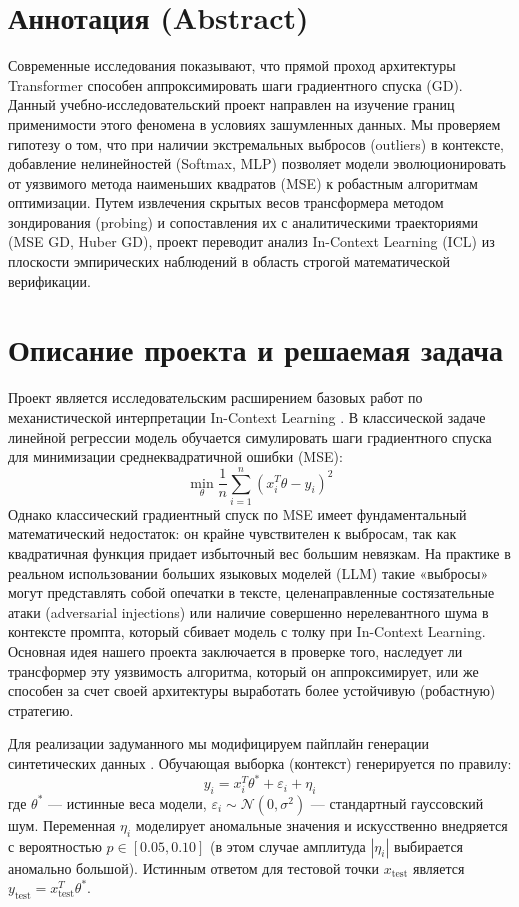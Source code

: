 \documentclass[12pt,a4paper]{article}
\begin{document}
\section*{Аннотация (Abstract)}
Современные исследования \cite{vonOswald2023} показывают, что прямой проход архитектуры Transformer способен аппроксимировать шаги градиентного спуска (GD). Данный учебно-исследовательский проект направлен на изучение границ применимости этого феномена в условиях зашумленных данных. Мы проверяем гипотезу о том, что при наличии экстремальных выбросов (outliers) в контексте, добавление нелинейностей (Softmax, MLP) позволяет модели эволюционировать от уязвимого метода наименьших квадратов (MSE) к робастным алгоритмам оптимизации. Путем извлечения скрытых весов трансформера методом зондирования (probing) и сопоставления их с аналитическими траекториями (MSE GD, Huber GD), проект переводит анализ In-Context Learning (ICL) из плоскости эмпирических наблюдений в область строгой математической верификации.

\section{Описание проекта и решаемая задача}
Проект является исследовательским расширением базовых работ по механистической интерпретации In-Context Learning \cite{vonOswald2023, garg2022what, akyurek2023what}. В классической задаче линейной регрессии модель обучается симулировать шаги градиентного спуска для минимизации среднеквадратичной ошибки (MSE):
\begin{equation}
    \min_\theta \frac{1}{n} \sum_{i=1}^n (x_i^T \theta - y_i)^2
\end{equation}
Однако классический градиентный спуск по MSE имеет фундаментальный математический недостаток: он крайне чувствителен к выбросам, так как квадратичная функция придает избыточный вес большим невязкам. На практике в реальном использовании больших языковых моделей (LLM) такие «выбросы» могут представлять собой опечатки в тексте, целенаправленные состязательные атаки (adversarial injections) или наличие совершенно нерелевантного шума в контексте промпта, который сбивает модель с толку при In-Context Learning. Основная идея нашего проекта заключается в проверке того, наследует ли трансформер эту уязвимость алгоритма, который он аппроксимирует, или же способен за счет своей архитектуры выработать более устойчивую (робастную) стратегию.

Для реализации задуманного мы модифицируем пайплайн генерации синтетических данных \cite{garg2022what}. Обучающая выборка (контекст) генерируется по правилу:
\begin{equation}
    y_i = x_i^T \theta^* + \varepsilon_i + \eta_i
\end{equation}
где $\theta^*$ — истинные веса модели, $\varepsilon_i \sim \mathcal{N}(0, \sigma^2)$ — стандартный гауссовский шум. Переменная $\eta_i$ моделирует аномальные значения и искусственно внедряется с вероятностью $p \in[0.05, 0.10]$ (в этом случае амплитуда $|\eta_i|$ выбирается аномально большой). Истинным ответом для тестовой точки $x_{\text{test}}$ является $y_{\text{test}} = x_{\text{test}}^T \theta^*$.
\end{document}
